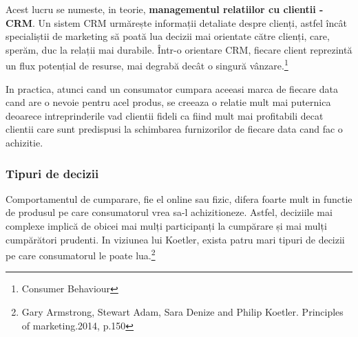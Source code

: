 \documentclass[a4paper, 12pt]{article}
\begin{document}
		\quad Acest lucru se numeste, in teorie, \textbf{managementul relatiilor cu clientii - CRM}. Un sistem CRM urmărește informații detaliate despre clienți, astfel încât specialiștii de marketing să poată lua decizii mai orientate către clienți, care, sperăm, duc la relații mai durabile. Într-o orientare CRM, fiecare client reprezintă un flux potențial de resurse, mai degrabă decât o singură vânzare.\footnote{Consumer Behaviour}
		
		\quad In practica, atunci cand un consumator cumpara aceeasi marca de fiecare data cand are o nevoie pentru acel produs, se creeaza o relatie mult mai puternica deoarece intreprinderile vad clientii fideli ca fiind mult mai profitabili decat clientii care sunt predispusi la schimbarea furnizorilor de fiecare data cand fac o achizitie.  
		
			\subsubsection{Tipuri de decizii}
				\quad Comportamentul de cumparare, fie el online sau fizic, difera foarte mult in functie de produsul pe care consumatorul vrea sa-l achizitioneze. Astfel, deciziile mai complexe implică de obicei mai mulți participanți la cumpărare și mai mulți cumpărători prudenti. In viziunea lui Koetler, exista patru mari tipuri de decizii pe care consumatorul le poate lua.\footnote{Gary Armstrong, Stewart Adam, Sara Denize and Philip Koetler. Principles of marketing.2014, p.150}
			\newpage
\end{document}

